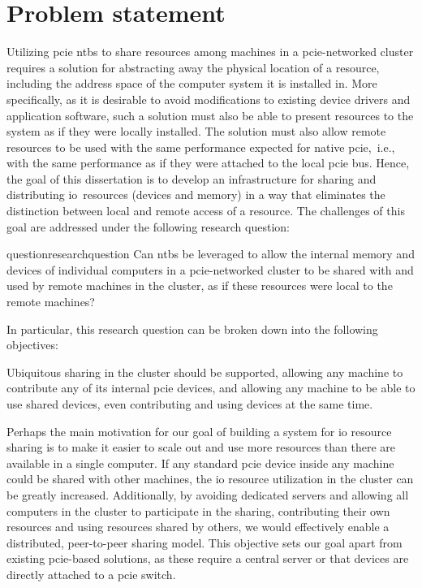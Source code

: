\section{Problem statement}\label{sec:objectives}
%
Utilizing \gls{pcie} \glspl{ntb} to share resources among machines in a \gls{pcie}-networked cluster requires a solution for abstracting away the physical location of a resource, including the address space of the computer system it is installed in. 
%
More specifically, as it is desirable to avoid modifications to existing device drivers and application software, such a solution must also be able to present resources to the system as if they were locally installed.
%
The solution must also allow remote resources to be used with the same performance expected for native \gls{pcie},~i.e., with the same performance as if they were attached to the local \gls{pcie} bus.
%
Hence, the goal of this dissertation is to develop an infrastructure for sharing and distributing \gls{io}~resources (devices and memory) in a way that eliminates the distinction between local and remote access of a resource. 
%
The challenges of this goal are addressed under the following research question: 
\begin{restatable}{question}{researchquestion}
    Can \glspl{ntb} be leveraged to allow the internal memory and devices of individual computers in a \gls{pcie}-networked cluster to be shared with and used by remote machines in the cluster, as if these resources were local to the remote machines?
\end{restatable}
%
In particular, this research question can be broken down into the following objectives:
%
\begin{objective}\label{obj:distributed}
    Ubiquitous sharing in the cluster should be supported, allowing any machine to contribute any of its internal \gls{pcie} devices, and allowing any machine to be able to use shared devices, even contributing and using devices at the same time.
\end{objective}
Perhaps the main motivation for our goal of building a system for \gls{io} resource sharing is to make it easier to scale out and use more resources than there are available in a single computer. 
If any standard \gls{pcie} device inside any machine could be shared with other machines, the \gls{io} resource utilization in the cluster can be greatly increased.
Additionally, by avoiding dedicated servers and allowing all computers in the cluster to participate in the sharing, contributing their own resources and using resources shared by others, we would effectively enable a distributed, peer-to-peer sharing model. 
This objective sets our goal apart from existing \gls{pcie}-based solutions, as these require a central server or that devices are directly attached to a \gls{pcie} switch.



